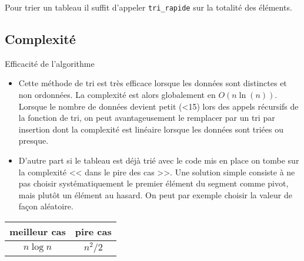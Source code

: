 Pour trier un tableau il suffit d'appeler \texttt{tri\_rapide} sur la totalité des éléments.


%
%
%

\subsection{Complexité}
\begin{prop}{Efficacité de l'algorithme}
\begin{itemize}
\item Cette méthode de tri est très efficace lorsque les données sont distinctes et non ordonnées. La complexité est alors globalement en $O(n \ln(n))$. Lorsque le nombre de données devient petit (<15) lors des appels récursifs de la fonction de tri, on peut avantageusement le remplacer par un tri par insertion dont la complexité est linéaire lorsque les données sont triées ou presque. \cite{Beynet}




\item D'autre part si le tableau est déjà trié avec le code mis en place on tombe sur la complexité << dans le pire des cas >>. Une solution simple consiste à ne pas choisir systématiquement
le premier élément du segment comme pivot, mais plutôt un élément au hasard. On peut par exemple choisir la valeur de façon aléatoire. \cite{wack}
\end{itemize}

\begin{center}
\begin{tabular}{|c|c|}
\hline 
 meilleur cas &  pire cas \\ 
\hline 
$n \log n$ & $n^2/2$ \\ 
\hline 
\end{tabular} 
\end{center}



\end{prop}






